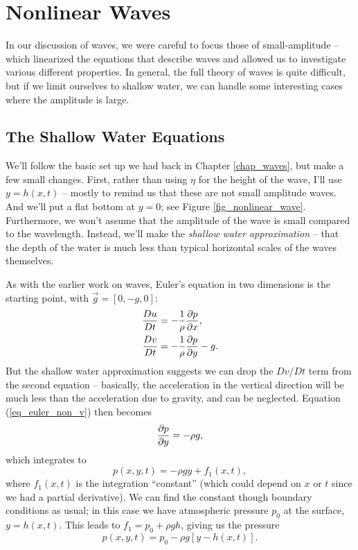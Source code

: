\section{Nonlinear Waves}

In our discussion of waves, we were careful to focus those of small-amplitude -- which linearized the equations that describe waves and allowed us to investigate various different properties.  In general, the full theory of waves is quite difficult, but if we limit ourselves to shallow water, we can handle some interesting cases where the amplitude is large.

\subsection{The Shallow Water Equations}

We'll follow the basic set up we had back in Chapter \ref{chap_waves}, but make a few small changes.  First, rather than using $\eta$ for the height of the wave, I'll use $y = h(x, t)$ -- mostly to remind us that these are not small amplitude waves.  And we'll put a flat bottom at $y = 0$; see Figure \ref{fig_nonlinear_wave}.  Furthermore, we won't assume that the amplitude of the wave is small compared to the wavelength.  Instead, we'll make the \emph{shallow water approximation} -- that the depth of the water is much less than typical horizontal scales of the waves themselves.


As with the earlier work on waves, Euler's equation in two dimensions is the starting point, with $\vec{g} = [0, -g, 0]$:
\begin{align}
\frac{Du}{Dt} & = -\frac{1}{\rho} \frac{\partial {p}}{\partial {x}}, \label{eq_euler_non_u}\\
\frac{Dv}{Dt} & = - \frac{1}{\rho} \frac{\partial {p}}{\partial {y}} - g. \label{eq_euler_non_v}
\end{align}
But the shallow water approximation suggests we can drop the $Dv/Dt$ term from the second equation -- basically, the acceleration in the vertical direction will be much less than the acceleration due to gravity, and can be neglected.  Equation (\ref{eq_euler_non_v}) then becomes
\[
\frac{\partial {p}}{\partial {y}} = -\rho g,
\]
which integrates to
\[
p(x, y, t) = -\rho g y + f_1(x, t),
\]
where $f_1(x, t)$ is the integration ``constant'' (which could depend on $x$ or $t$ since we had a partial derivative).  We can find the constant though boundary conditions as usual; in this case we have atmospheric pressure $p_0$ at the surface, $y = h(x, t)$.  This leads to $f_1 = p_0 + \rho g h$, giving us the pressure
\begin{equation}
p(x, y, t) = p_0 - \rho g [ y - h(x, t)].
\end{equation}

